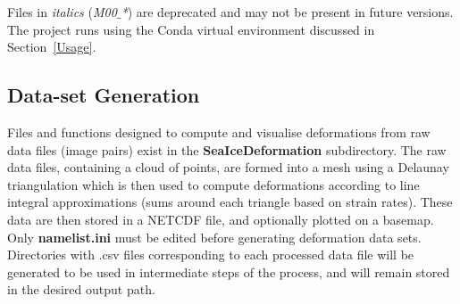 \documentclass{article}
\begin{document}
    Files in \textit{italics} (\textit{M00$\_$*}) are deprecated and may not be present in future versions. The project runs using the Conda virtual environment discussed in Section~\ref{Usage}.

    \subsection{Data-set Generation}

        Files and functions designed to compute and visualise deformations from raw data files (image pairs) exist in the \textbf{SeaIceDeformation} subdirectory. The raw data files, containing a cloud of points, are formed into a mesh using a Delaunay triangulation which is then used to compute deformations according to line integral approximations (sums around each triangle based on strain rates). These data are then stored in a NETCDF file, and optionally plotted on a basemap. Only \textbf{namelist.ini} must be edited before generating deformation data sets. Directories with .csv files corresponding to each processed data file will be generated to be used in intermediate steps of the process, and will remain stored in the desired output path.
\end{document}
